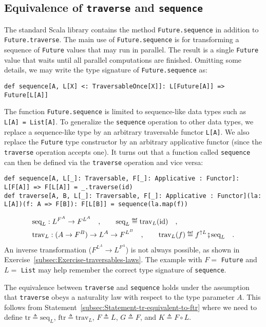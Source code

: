 \subsection{Equivalence of \texttt{traverse} and \texttt{sequence}}

The standard Scala library contains the method \lstinline!Future.sequence!
in addition to \lstinline!Future.traverse!. The main use of \lstinline!Future.sequence!
is for transforming a sequence of \lstinline!Future! values that
may run in parallel. The result is a single \lstinline!Future! value
that waits until all parallel computations are finished. Omitting
some details, we may write the type signature of \lstinline!Future.sequence!
as:
\begin{lstlisting}
def sequence[A, L[X] <: TraversableOnce[X]]: L[Future[A]] => Future[L[A]]
\end{lstlisting}

The function \lstinline!Future.sequence! is limited to sequence-like
data types such as \lstinline!L[A] = List[A]!. To generalize the
\lstinline!sequence! operation to other data types, we replace a
sequence-like type by an arbitrary traversable functor \lstinline!L[A]!.
We also replace the \lstinline!Future! type constructor by an arbitrary
applicative functor (since the \lstinline!traverse! operation accepts
one). It turns out that a function called \lstinline!sequence! can
then be defined via the \lstinline!traverse! operation and vice versa:
\begin{lstlisting}
def sequence[A, L[_]: Traversable, F[_]: Applicative : Functor]: L[F[A]] => F[L[A]] = _.traverse(id)
def traverse[A, B, L[_]: Traversable, F[_]: Applicative : Functor](la: L[A])(f: A => F[B]): F[L[B]] = sequence(la.map(f))
\end{lstlisting}
\begin{align*}
 & \text{seq}_{L}:L^{F^{A}}\rightarrow F^{L^{A}}\quad,\quad\quad\text{seq}_{L}\triangleq\text{trav}_{L}(\text{id})\quad,\\
 & \text{trav}_{L}:(A\rightarrow F^{B})\rightarrow L^{A}\rightarrow F^{L^{B}}\quad,\quad\quad\text{trav}_{L}(f)\triangleq f^{\uparrow L}\bef\text{seq}_{L}\quad.
\end{align*}
An inverse transformation ($F^{L^{A}}\rightarrow L^{F^{A}}$) is not
always possible, as shown in Exercise~\ref{subsec:Exercise-traversables-laws}.
The example with $F=$ \lstinline!Future! and $L=$ \lstinline!List!
may help remember the correct type signature of \lstinline!sequence!.

The equivalence between \lstinline!traverse! and \lstinline!sequence!
holds under the assumption that \lstinline!traverse! obeys a naturality
law with respect to the type parameter $A$. This follows from Statement~\ref{subsec:Statement-tr-equivalent-to-ftr}
where we need to define $\text{tr}\triangleq\text{seq}_{L}$, $\text{ftr}\triangleq\text{trav}_{L}$,
$F\triangleq L$, $G\triangleq F$, and $K\triangleq F\circ L$. 

